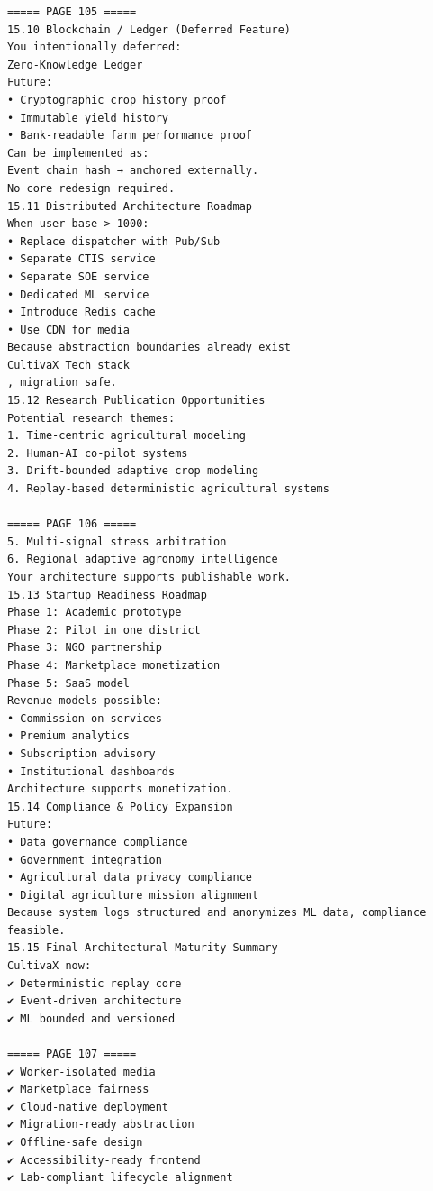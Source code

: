 \documentclass{article}
\begin{document}
\begin{verbatim}
===== PAGE 105 =====
15.10 Blockchain / Ledger (Deferred Feature)
You intentionally deferred:
Zero-Knowledge Ledger
Future:
• Cryptographic crop history proof
• Immutable yield history
• Bank-readable farm performance proof
Can be implemented as:
Event chain hash → anchored externally.
No core redesign required.
15.11 Distributed Architecture Roadmap
When user base > 1000:
• Replace dispatcher with Pub/Sub
• Separate CTIS service
• Separate SOE service
• Dedicated ML service
• Introduce Redis cache
• Use CDN for media
Because abstraction boundaries already exist
CultivaX Tech stack
, migration safe.
15.12 Research Publication Opportunities
Potential research themes:
1. Time-centric agricultural modeling
2. Human-AI co-pilot systems
3. Drift-bounded adaptive crop modeling
4. Replay-based deterministic agricultural systems

===== PAGE 106 =====
5. Multi-signal stress arbitration
6. Regional adaptive agronomy intelligence
Your architecture supports publishable work.
15.13 Startup Readiness Roadmap
Phase 1: Academic prototype
Phase 2: Pilot in one district
Phase 3: NGO partnership
Phase 4: Marketplace monetization
Phase 5: SaaS model
Revenue models possible:
• Commission on services
• Premium analytics
• Subscription advisory
• Institutional dashboards
Architecture supports monetization.
15.14 Compliance & Policy Expansion
Future:
• Data governance compliance
• Government integration
• Agricultural data privacy compliance
• Digital agriculture mission alignment
Because system logs structured and anonymizes ML data, compliance feasible.
15.15 Final Architectural Maturity Summary
CultivaX now:
✔ Deterministic replay core
✔ Event-driven architecture
✔ ML bounded and versioned

===== PAGE 107 =====
✔ Worker-isolated media
✔ Marketplace fairness
✔ Cloud-native deployment
✔ Migration-ready abstraction
✔ Offline-safe design
✔ Accessibility-ready frontend
✔ Lab-compliant lifecycle alignment
\end{verbatim}
\end{document}
